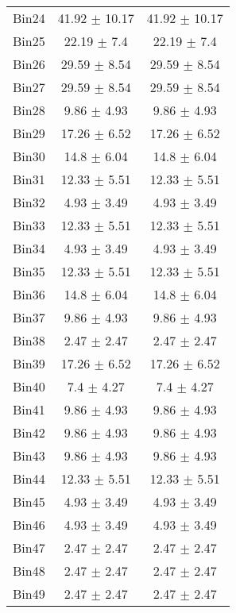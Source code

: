 \begin{tabular}{|c|c|c|}
     Bin24 & 41.92 $\pm$ 10.17 & 41.92 $\pm$ 10.17 \\ \cline{1-3} 
     Bin25 & 22.19 $\pm$ 7.4 & 22.19 $\pm$ 7.4 \\ \cline{1-3} 
     Bin26 & 29.59 $\pm$ 8.54 & 29.59 $\pm$ 8.54 \\ \cline{1-3} 
     Bin27 & 29.59 $\pm$ 8.54 & 29.59 $\pm$ 8.54 \\ \cline{1-3} 
     Bin28 & 9.86 $\pm$ 4.93 & 9.86 $\pm$ 4.93 \\ \cline{1-3} 
     Bin29 & 17.26 $\pm$ 6.52 & 17.26 $\pm$ 6.52 \\ \cline{1-3} 
     Bin30 & 14.8 $\pm$ 6.04 & 14.8 $\pm$ 6.04 \\ \cline{1-3} 
     Bin31 & 12.33 $\pm$ 5.51 & 12.33 $\pm$ 5.51 \\ \cline{1-3} 
     Bin32 & 4.93 $\pm$ 3.49 & 4.93 $\pm$ 3.49 \\ \cline{1-3} 
     Bin33 & 12.33 $\pm$ 5.51 & 12.33 $\pm$ 5.51 \\ \cline{1-3} 
     Bin34 & 4.93 $\pm$ 3.49 & 4.93 $\pm$ 3.49 \\ \cline{1-3} 
     Bin35 & 12.33 $\pm$ 5.51 & 12.33 $\pm$ 5.51 \\ \cline{1-3} 
     Bin36 & 14.8 $\pm$ 6.04 & 14.8 $\pm$ 6.04 \\ \cline{1-3} 
     Bin37 & 9.86 $\pm$ 4.93 & 9.86 $\pm$ 4.93 \\ \cline{1-3} 
     Bin38 & 2.47 $\pm$ 2.47 & 2.47 $\pm$ 2.47 \\ \cline{1-3} 
     Bin39 & 17.26 $\pm$ 6.52 & 17.26 $\pm$ 6.52 \\ \cline{1-3} 
     Bin40 & 7.4 $\pm$ 4.27 & 7.4 $\pm$ 4.27 \\ \cline{1-3} 
     Bin41 & 9.86 $\pm$ 4.93 & 9.86 $\pm$ 4.93 \\ \cline{1-3} 
     Bin42 & 9.86 $\pm$ 4.93 & 9.86 $\pm$ 4.93 \\ \cline{1-3} 
     Bin43 & 9.86 $\pm$ 4.93 & 9.86 $\pm$ 4.93 \\ \cline{1-3} 
     Bin44 & 12.33 $\pm$ 5.51 & 12.33 $\pm$ 5.51 \\ \cline{1-3} 
     Bin45 & 4.93 $\pm$ 3.49 & 4.93 $\pm$ 3.49 \\ \cline{1-3} 
     Bin46 & 4.93 $\pm$ 3.49 & 4.93 $\pm$ 3.49 \\ \cline{1-3} 
     Bin47 & 2.47 $\pm$ 2.47 & 2.47 $\pm$ 2.47 \\ \cline{1-3} 
     Bin48 & 2.47 $\pm$ 2.47 & 2.47 $\pm$ 2.47 \\ \cline{1-3} 
     Bin49 & 2.47 $\pm$ 2.47 & 2.47 $\pm$ 2.47 \\ \cline{1-3} 

\end{tabular}
